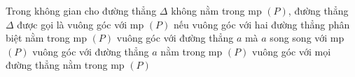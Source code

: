 	\begin{ex}%
		Trong không gian cho đường thẳng $\Delta$ không nằm trong mp $( P )$, đường thẳng $\Delta$ được gọi là vuông góc với mp $( P )$ nếu
		\choice 
		{ vuông góc với hai đường thẳng phân biệt nằm trong mp $( P )$} 
		{ vuông góc với đường thẳng $a$ mà $a$ song song với mp $( P )$ } 
		{ vuông góc với đường thẳng $a$ nằm trong mp $( P )$} 
		{\True vuông góc với mọi đường thẳng nằm trong mp $( P )$}
	\end{ex}
